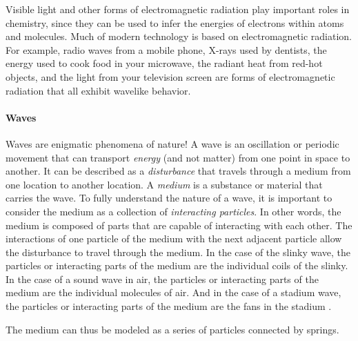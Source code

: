 \documentclass{article}
\begin{document}
{Visible light and other forms of electromagnetic radiation play important roles in chemistry, since they can be used to infer the energies of electrons within atoms and molecules. Much of modern technology is based on electromagnetic radiation. For example, radio waves from a mobile phone, X-rays used by dentists, the energy used to cook food in your microwave, the radiant heat from red-hot objects, and the light from your television screen are forms of electromagnetic radiation that all exhibit wavelike behavior.


\paragraph{Waves}

Waves are enigmatic phenomena of nature!  A wave is an oscillation or periodic movement that can transport \emph{energy} (and not matter) from one point in space to another. It can be described \cite{the-physics-class} as a \emph{disturbance} that travels through a medium from one location to another location. A \emph{medium} is a substance or material that carries the wave. To fully understand the nature of a wave, it is important to consider the medium as a collection of \emph{interacting particles}. In other words, the medium is composed of parts that are capable of interacting with each other. The interactions of one particle of the medium with the next adjacent particle allow the disturbance to travel through the medium. In the case of the slinky wave, the particles or interacting parts of the medium are the individual coils of the slinky. In the case of a sound wave in air, the particles or interacting parts of the medium are the individual molecules of air. And in the case of a stadium wave, the particles or interacting parts of the medium are the fans in the stadium \cite{the-physics-class-waves}. 

The medium can thus be modeled as a series of particles connected by springs.

}
\end{document}
